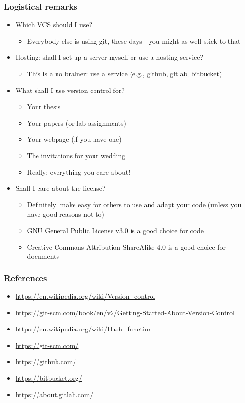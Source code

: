 \documentclass[9pt]{beamer}
\begin{document}
\begin{frame}
  \frametitle{Logistical remarks}
  \begin{itemize}
  \item Which VCS should I use?
    \begin{itemize}
    \item Everybody else is using git, these days---you might as well stick
      to that
    \end{itemize}
  \item Hosting: shall I set up a server myself or use a hosting service?
    \begin{itemize}
    \item This is a no brainer: use a service (e.g., github, gitlab, bitbucket)
    \end{itemize}
  \item What shall I use version control for?
    \begin{itemize}
    \item Your thesis
    \item Your papers (or lab assignments)
    \item Your webpage (if you have one)
    \item The invitations for your wedding
    \item Really: everything you care about!
    \end{itemize}
  \item Shall I care about the license?
    \begin{itemize}
    \item Definitely: make easy for others to use and adapt your code
      (unless you have good reasons not to)
    \item GNU General Public License v3.0 is a good choice for code
    \item Creative Commons Attribution-ShareAlike 4.0 is a good choice for
      documents
    \end{itemize}
  \end{itemize}
\end{frame}


\begin{frame}
  \frametitle{References}
  \scriptsize
  \begin{itemize}
  \item \url{https://en.wikipedia.org/wiki/Version_control}
  \item \url{https://git-scm.com/book/en/v2/Getting-Started-About-Version-Control}
  \item \url{https://en.wikipedia.org/wiki/Hash_function}
  \item \url{https://git-scm.com/}
  \item \url{https://github.com/}
  \item \url{https://bitbucket.org/}
  \item \url{https://about.gitlab.com/}
  \end{itemize}
\end{frame}
\end{document}
